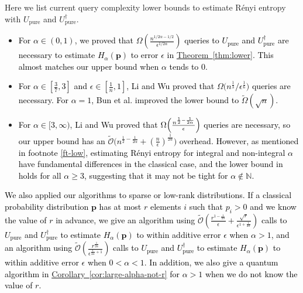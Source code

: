 \documentclass[journal]{IEEEtran}
\newcommand{\thm}[1]{\hyperref[thm:#1]{Theorem~\ref*{thm:#1}}}
\newcommand{\cor}[1]{\hyperref[cor:#1]{Corollary~\ref*{cor:#1}}}
\begin{document}
Here we list current query complexity lower bounds to estimate R{\'e}nyi entropy with $U_{\mathrm{pure}}$ and $U_{\mathrm{pure}}^\dagger$. 
\begin{itemize}[leftmargin=15pt]
    \item \textcolor{black}{For $\alpha \in(0,1)$, we proved that $\Omega\left(\frac{n^{1/2\alpha-1/2}}{\epsilon^{1/2\alpha}}\right)$ queries to $U_{\mathrm{pure}}$ and $U_{\mathrm{pure}}^\dagger$ are necessary to estimate $H_{\alpha}(\mathbf{p})$ to error $\epsilon$ in \thm{lower}. This almost matches our upper bound when $\alpha$ tends to $0$.} 
    \item \textcolor{black}{For $\alpha \in [\frac{3}{7},3]$ and $\epsilon \in [\frac{1}{n},1]$, Li and Wu \cite{li2019entropy} proved that $\Omega\bigl(n^{\frac{1}{3}}/\epsilon^{\frac{1}{6}}\bigr)$ queries are necessary. For $\alpha =1$, Bun et al. \cite{bun2018polynomial} improved the lower bound to $\tilde{\Omega}(\sqrt{n})$.}
    \item \textcolor{black}{For $\alpha \in[3,\infty)$, Li and Wu \cite{li2019entropy} proved that $\Omega\Bigl(\frac{n^{\frac{1}{2 }-\frac{1}{2 \alpha}}}{\epsilon}\Bigr)$ queries are necessary, so our upper bound has an $\widetilde{\mathcal{O}}\bigl(n^{\frac{1}{2}-\frac{1}{2\alpha}}+(\frac{n}{\epsilon})^{\frac{1}{2\alpha}}\bigr)$ overhead. However, as mentioned in footnote \ref{ft-low}, estimating R{\'e}nyi entropy for integral and non-integral $\alpha$ have fundamental differences in the classical case, and the lower bound in \cite{li2019entropy} holds for all $\alpha \ge 3$, suggesting that it may not be tight for $\alpha \not \in \mathbb{N}$. }
\end{itemize}

\textcolor{black}{We also applied our algorithms to sparse or low-rank distributions. If a classical probability distribution $\mathbf{p}$ has at most $r$ elements $i$ such that $p_i > 0$ and we know the value of $r$ in advance, we give an algorithm using  $\widetilde{\mathcal{O}}\left(\frac{r^{1-\frac{1}{2\alpha}}}{\epsilon} + \frac{\sqrt{r}}{\epsilon^{1+\frac{1}{2\alpha}}}\right)$ calls to $U_{\mathrm{pure}}$ and $U_{\mathrm{pure}}^{\dagger}$ to estimate $H_{\alpha}(\mathbf{p})$ to within additive error $\epsilon$ when $\alpha >  1$, and an algorithm using $\widetilde{\mathcal{O}}\left(\frac{r^{\frac{1}{2\alpha}}}{\epsilon^{\frac{1}{2\alpha}+1}}\right)$ calls to $U_{\mathrm{pure}}$ and $U_{\mathrm{pure}}^{\dagger}$ to estimate $H_{\alpha}(\mathbf{p})$ to within additive error $\epsilon$ when $0<\alpha<1$. In addition, we also give a quantum algorithm in \cor{large-alpha-not-r} for $\alpha > 1$ when we do not know the value of $r$.}
\end{document}
